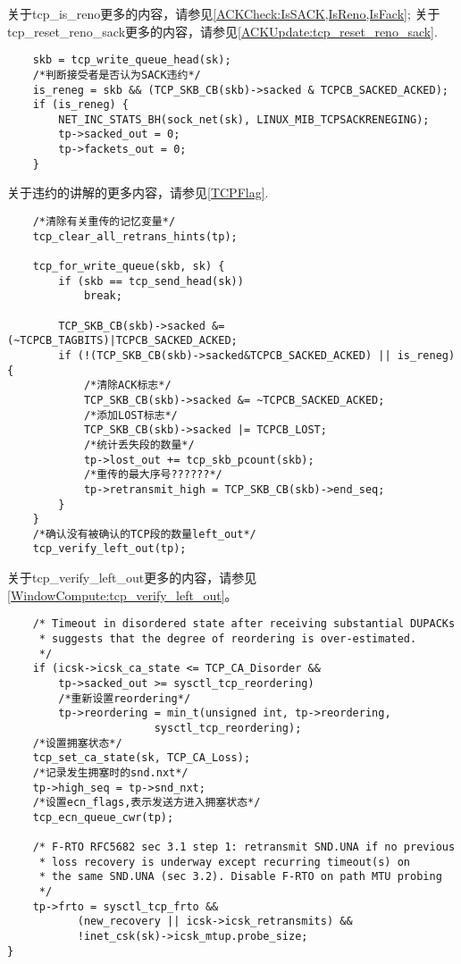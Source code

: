    关于tcp\_is\_reno更多的内容，请参见\ref{ACKCheck:IsSACK,IsReno,IsFack};
    关于tcp\_reset\_reno\_sack更多的内容，请参见\ref{ACKUpdate:tcp_reset_reno_sack}.

\begin{verbatim}
    skb = tcp_write_queue_head(sk);
    /*判断接受者是否认为SACK违约*/
    is_reneg = skb && (TCP_SKB_CB(skb)->sacked & TCPCB_SACKED_ACKED);
    if (is_reneg) {
        NET_INC_STATS_BH(sock_net(sk), LINUX_MIB_TCPSACKRENEGING);
        tp->sacked_out = 0;
        tp->fackets_out = 0;
    }
\end{verbatim}

    关于违约的讲解的更多内容，请参见\ref{TCPFlag}.
\begin{verbatim}
    /*清除有关重传的记忆变量*/
    tcp_clear_all_retrans_hints(tp);

    tcp_for_write_queue(skb, sk) {
        if (skb == tcp_send_head(sk))
            break;

        TCP_SKB_CB(skb)->sacked &= (~TCPCB_TAGBITS)|TCPCB_SACKED_ACKED;
        if (!(TCP_SKB_CB(skb)->sacked&TCPCB_SACKED_ACKED) || is_reneg) {
            /*清除ACK标志*/
            TCP_SKB_CB(skb)->sacked &= ~TCPCB_SACKED_ACKED;
            /*添加LOST标志*/            
            TCP_SKB_CB(skb)->sacked |= TCPCB_LOST;
            /*统计丢失段的数量*/            
            tp->lost_out += tcp_skb_pcount(skb);
            /*重传的最大序号??????*/
            tp->retransmit_high = TCP_SKB_CB(skb)->end_seq;
        }
    }
    /*确认没有被确认的TCP段的数量left_out*/
    tcp_verify_left_out(tp);
\end{verbatim}

    关于tcp\_verify\_left\_out更多的内容，请参见\ref{WindowCompute:tcp_verify_left_out}。
    
\begin{verbatim}
    /* Timeout in disordered state after receiving substantial DUPACKs
     * suggests that the degree of reordering is over-estimated.
     */
    if (icsk->icsk_ca_state <= TCP_CA_Disorder &&
        tp->sacked_out >= sysctl_tcp_reordering)
        /*重新设置reordering*/
        tp->reordering = min_t(unsigned int, tp->reordering,
                       sysctl_tcp_reordering);
    /*设置拥塞状态*/    
    tcp_set_ca_state(sk, TCP_CA_Loss);
    /*记录发生拥塞时的snd.nxt*/
    tp->high_seq = tp->snd_nxt;
    /*设置ecn_flags,表示发送方进入拥塞状态*/    
    tcp_ecn_queue_cwr(tp);

    /* F-RTO RFC5682 sec 3.1 step 1: retransmit SND.UNA if no previous
     * loss recovery is underway except recurring timeout(s) on
     * the same SND.UNA (sec 3.2). Disable F-RTO on path MTU probing
     */
    tp->frto = sysctl_tcp_frto &&
           (new_recovery || icsk->icsk_retransmits) &&
           !inet_csk(sk)->icsk_mtup.probe_size;
}
\end{verbatim}


